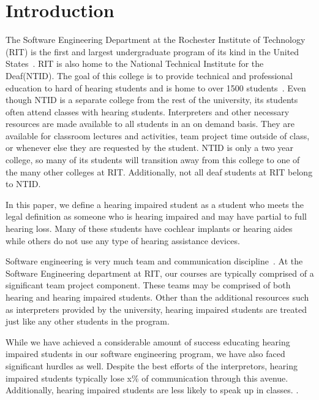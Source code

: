 \documentclass{acm_proc_article-sp}
\begin{document}
\section{Introduction}
The Software Engineering Department at the Rochester Institute of Technology (RIT) is the first and largest undergraduate program of its kind in the United States~\cite{FIE_Instill}. RIT is also home to the National Technical Institute for the Deaf(NTID). The goal of this college is to provide technical and professional education to hard of hearing students and is home to over 1500 students~\cite{ntidurl}. Even though NTID is a separate college from the rest of the university, its students often attend classes with hearing students. Interpreters and other necessary resources are made available to all students in an on demand basis. They are available for classroom lectures and activities, team project time outside of class, or whenever else they are requested by the student. NTID is only a two year college, so many of its students will transition away from this college to one of the many other colleges at RIT. Additionally, not all deaf students at RIT belong to NTID.

In this paper, we define a hearing impaired student as a student who meets the legal definition as someone who is hearing impaired and may have partial to full hearing loss. Many of these students have cochlear implants or hearing aides while others do not use any type of hearing assistance devices. 

Software engineering is very much team and communication discipline~\cite{Pieterse:2006:SET:1216262.1216282}. At the Software Engineering department at RIT, our courses are typically comprised of a significant team project component. These teams may be comprised of both hearing and hearing impaired students. Other than the additional resources such as interpreters provided by the university, hearing impaired students are treated just like any other students in the program.





While we have achieved a considerable amount of success educating hearing impaired students in our software engineering program, we have also faced significant hurdles as well. Despite the best efforts of the interpretors, hearing impaired students typically lose x\% of communication through this avenue. Additionally, hearing impaired students are less likely to speak up in classes. . 
\end{document}

